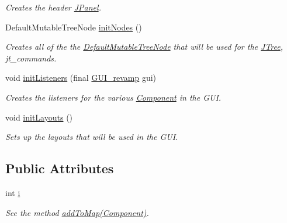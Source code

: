 \begin{DoxyCompactItemize}
\begin{DoxyCompactList}\small\item\em Creates the header \hyperlink{}{J\+Panel}. \end{DoxyCompactList}\item 
Default\+Mutable\+Tree\+Node \hyperlink{classedu_1_1udel_1_1cis_1_1vsl_1_1civl_1_1gui_1_1common_1_1GUI__revamp_a82568a73c3eefed8bd3bf66e5fcc7a9c}{init\+Nodes} ()
\begin{DoxyCompactList}\small\item\em Creates all of the the \hyperlink{}{Default\+Mutable\+Tree\+Node} that will be used for the \hyperlink{}{J\+Tree}, jt\+\_\+commands. \end{DoxyCompactList}\item 
void \hyperlink{classedu_1_1udel_1_1cis_1_1vsl_1_1civl_1_1gui_1_1common_1_1GUI__revamp_af7b372ff2611eb90f7392732a4ece869}{init\+Listeners} (final \hyperlink{classedu_1_1udel_1_1cis_1_1vsl_1_1civl_1_1gui_1_1common_1_1GUI__revamp}{G\+U\+I\+\_\+revamp} gui)
\begin{DoxyCompactList}\small\item\em Creates the listeners for the various \hyperlink{}{Component} in the G\+U\+I. \end{DoxyCompactList}\item 
void \hyperlink{classedu_1_1udel_1_1cis_1_1vsl_1_1civl_1_1gui_1_1common_1_1GUI__revamp_aac6d63766c1a2b0e294b6b53dc1ac6e3}{init\+Layouts} ()
\begin{DoxyCompactList}\small\item\em Sets up the layouts that will be used in the G\+U\+I. \end{DoxyCompactList}\end{DoxyCompactItemize}
\subsection*{Public Attributes}
\begin{DoxyCompactItemize}
\item 
\hypertarget{classedu_1_1udel_1_1cis_1_1vsl_1_1civl_1_1gui_1_1common_1_1GUI__revamp_a91b5ccd88af3e3361662b7cfd853a707}{}int \hyperlink{classedu_1_1udel_1_1cis_1_1vsl_1_1civl_1_1gui_1_1common_1_1GUI__revamp_a91b5ccd88af3e3361662b7cfd853a707}{i}\label{classedu_1_1udel_1_1cis_1_1vsl_1_1civl_1_1gui_1_1common_1_1GUI__revamp_a91b5ccd88af3e3361662b7cfd853a707}

\begin{DoxyCompactList}\small\item\em See the method \hyperlink{classedu_1_1udel_1_1cis_1_1vsl_1_1civl_1_1gui_1_1common_1_1GUI__revamp_a290b0b6e4c62a9bc469558d4ffbee228}{add\+To\+Map(\+Component)}. \end{DoxyCompactList}\end{DoxyCompactItemize}



